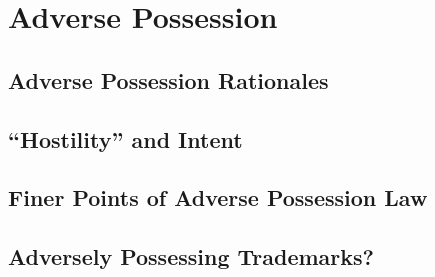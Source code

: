 \chapter{Adverse Possession}



\section{Adverse Possession Rationales}





\begin{questions}



\end{questions}



\section{``Hostility'' and Intent}





%

\begin{questions}

\end{questions}

\section{Finer Points of Adverse Possession Law}





\section{Adversely Possessing Trademarks?}




\begin{questions}

\end{questions}

